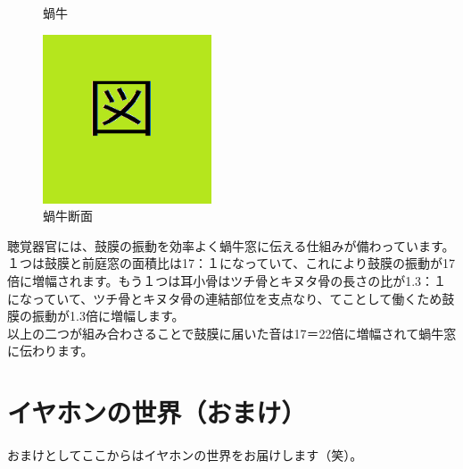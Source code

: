 \documentclass[11pt,b5paper,papersize,dvipdfmx]{jsbook}
\begin{document}
\begin{itemize}
\begin{figure}[H]
    \caption{蝸牛}
  \end{figure}
  \begin{figure}[H]
    \centering
    \includegraphics[width=5cm]{nsmr/img/zu.png}
    \caption{蝸牛断面}
  \end{figure}

\end{itemize} %
聴覚器官には、鼓膜の振動を効率よく蝸牛窓に伝える仕組みが備わっています。\\
１つは鼓膜と前庭窓の面積比は17：１になっていて、これにより鼓膜の振動が17倍に増幅されます。もう１つは耳小骨はツチ骨とキヌタ骨の長さの比が1.3：１になっていて、ツチ骨とキヌタ骨の連結部位を支点なり、てことして働くため鼓膜の振動が1.3倍に増幅します。\\
以上の二つが組み合わさることで鼓膜に届いた音は17＝22倍に増幅されて蝸牛窓に伝わります。
\fi


\section{イヤホンの世界（おまけ）}
おまけとしてここからはイヤホンの世界をお届けします（笑）。

%
\end{document}
